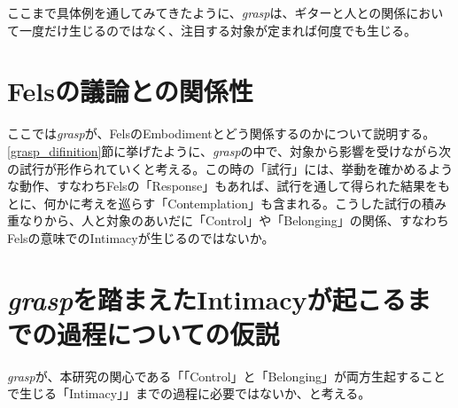 ここまで具体例を通してみてきたように、\textit{grasp}は、ギターと人との関係において一度だけ生じるのではなく、注目する対象が定まれば何度でも生じる。


\section{Felsの議論との関係性}
ここでは\textit{grasp}が、FelsのEmbodimentとどう関係するのかについて説明する。
\ref{grasp_difinition}節に挙げたように、\textit{grasp}の中で、対象から影響を受けながら次の試行が形作られていくと考える。この時の「試行」には、挙動を確かめるような動作、すなわちFelsの「Response」もあれば、試行を通して得られた結果をもとに、何かに考えを巡らす「Contemplation」も含まれる。こうした試行の積み重なりから、人と対象のあいだに「Control」や「Belonging」の関係、すなわちFelsの意味でのIntimacyが生じるのではないか。

\section{\textit{grasp}を踏まえたIntimacyが起こるまでの過程についての仮説}
\textit{grasp}が、本研究の関心である「「Control」と「Belonging」が両方生起することで生じる「Intimacy」」までの過程に必要ではないか、と考える。


